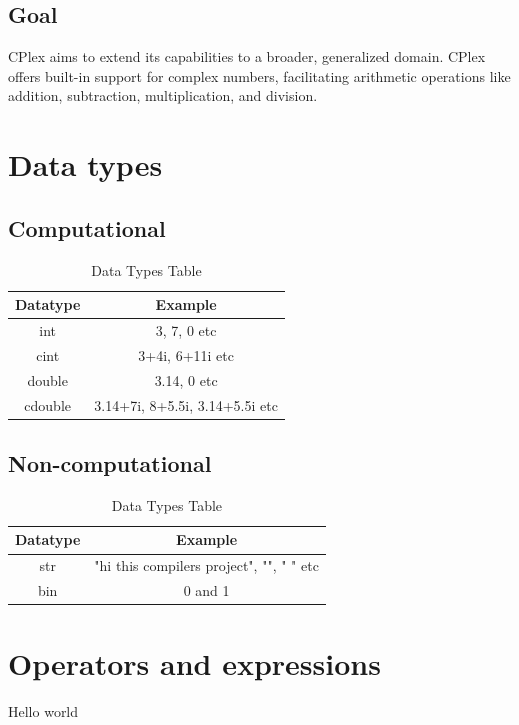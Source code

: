 \documentclass[12pt]{article}
\begin{document}
\subsection{Goal}
CPlex aims to extend its capabilities to a broader, generalized domain. CPlex offers built-in support for complex numbers, facilitating arithmetic operations like addition, subtraction, multiplication, and division. 
\section{Data types}

\subsection{Computational}
\begin{table}[ht]
\centering
\renewcommand{\arraystretch}{1.5} %
\setlength{\tabcolsep}{30pt} %
\begin{tabular}{|c|c|}
\hline
\bfseries Datatype & \bfseries Example \\
\hline
int &  3, 7, 0 etc\\
\hline
cint &  3+4i, 6+11i etc\\
\hline
double &  3.14, 0 etc \\
\hline
cdouble &   3.14+7i, 8+5.5i, 3.14+5.5i etc\\

\hline
\end{tabular}
\caption{Data Types Table}
\end{table}
\subsection{Non-computational}

\begin{table}[ht]
\centering
\renewcommand{\arraystretch}{1.5} %
\setlength{\tabcolsep}{30pt} %
\begin{tabular}{|c|c|}
\hline
\bfseries Datatype & \bfseries Example \\
\hline

\hline
str &  "hi this compilers project", "", " " etc\\
\hline
bin &  0 and 1\\
\hline
\end{tabular}
\caption{Data Types Table}
\end{table}
\section{Operators and expressions}
Hello world 
\end{document}
